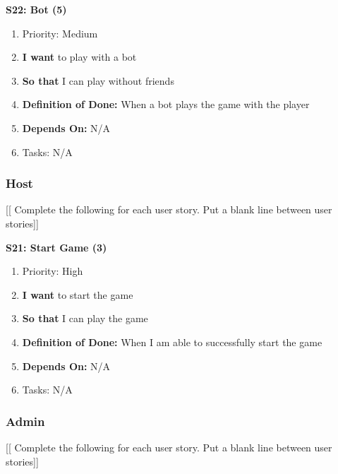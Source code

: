 \textbf{S22: Bot (5)}
\begin{enumerate}
    \item Priority: Medium
    \item \textbf{I want} to play with a bot
    \item \textbf{So that} I can play without friends
    \item \textbf{Definition of Done:} When a bot plays the game with the player
    \item \textbf{Depends On:} N/A
    \item Tasks: N/A
\end{enumerate}



\subsubsection{Host}

[[ Complete the following for each user story.
Put a blank line between user stories]]

\textbf{S21: Start Game (3)}
\begin{enumerate}
    \item Priority: High
    \item \textbf{I want} to start the game
    \item \textbf{So that} I can play the game
    \item \textbf{Definition of Done:} When I am able to successfully start the game
    \item \textbf{Depends On:} N/A
    \item Tasks: N/A
\end{enumerate}


\subsubsection{Admin}

[[ Complete the following for each user story.
Put a blank line between user stories]]

